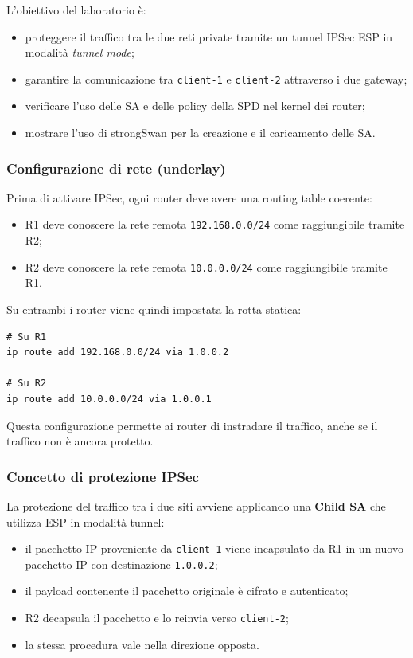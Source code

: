 L’obiettivo del laboratorio è:

\begin{itemize}
    \item proteggere il traffico tra le due reti private tramite un tunnel IPSec ESP
          in modalità \textit{tunnel mode};
    \item garantire la comunicazione tra \texttt{client-1} e \texttt{client-2} attraverso i due gateway;
    \item verificare l’uso delle SA e delle policy della SPD nel kernel dei router;
    \item mostrare l’uso di strongSwan per la creazione e il caricamento delle SA.
\end{itemize}

\subsubsection{Configurazione di rete (underlay)}

Prima di attivare IPSec, ogni router deve avere una routing table coerente:

\begin{itemize}
    \item R1 deve conoscere la rete remota \texttt{192.168.0.0/24} come raggiungibile tramite R2;
    \item R2 deve conoscere la rete remota \texttt{10.0.0.0/24} come raggiungibile tramite R1.
\end{itemize}

Su entrambi i router viene quindi impostata la rotta statica:

\begin{verbatim}
# Su R1
ip route add 192.168.0.0/24 via 1.0.0.2

# Su R2
ip route add 10.0.0.0/24 via 1.0.0.1
\end{verbatim}

Questa configurazione permette ai router di instradare il traffico, anche se il traffico
non è ancora protetto.

\subsubsection{Concetto di protezione IPSec}

La protezione del traffico tra i due siti avviene applicando una \textbf{Child SA} che utilizza
ESP in modalità tunnel:

\begin{itemize}
    \item il pacchetto IP proveniente da \texttt{client-1} viene incapsulato da R1 in un
          nuovo pacchetto IP con destinazione \texttt{1.0.0.2};
    \item il payload contenente il pacchetto originale è cifrato e autenticato;
    \item R2 decapsula il pacchetto e lo reinvia verso \texttt{client-2};
    \item la stessa procedura vale nella direzione opposta.
\end{itemize}

